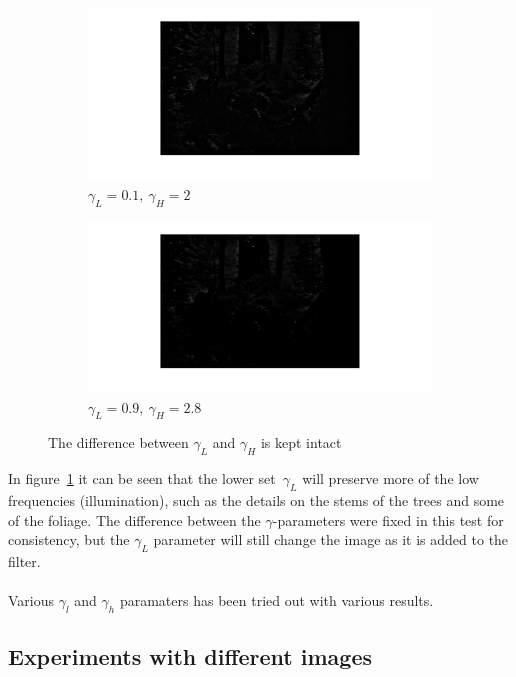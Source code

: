 		\begin{figure}[h!]
        \centering
        \begin{subfigure}[b]{0.6\textwidth}
                \includegraphics[width=\textwidth]{pics/gamma_difference_emph_lowfreq.png}
                \caption{$\gamma_L = 0.1,~\gamma_H = 2$}
                \label{fig:gamma_l_emph}
        \end{subfigure}%
        \begin{subfigure}[b]{0.6\textwidth}
                \includegraphics[width=\textwidth]{pics/gamma_difference_no_emph_lowfreq.png}
                \caption{$\gamma_L = 0.9,~\gamma_H = 2.8$}
                \label{fig:gamma_l}
        \end{subfigure}
        \caption{The difference between $\gamma_L$ and $\gamma_H$ is kept intact}\label{fig:gamma_diff}
		\end{figure}
		In figure~\ref{fig:gamma_l_emph} it can be seen that the lower set~$\gamma_L$ will preserve
		more of the low frequencies (illumination), such as the details on the stems of the trees
		and some of the foliage. The difference between the $\gamma$-parameters were fixed in
		this test for consistency, but the $\gamma_L$ parameter will still change the image
		as it is added to the filter. %
		\\
		\\
		Various $\gamma_l$ and $\gamma_h$ paramaters has been tried out with various results.
		
	
	\subsection{Experiments with different images}

% 